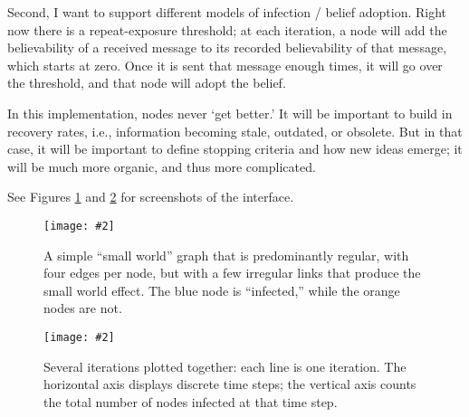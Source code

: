 \documentclass[11pt]{article}
\newcommand\cgraphics[2][]{\centerline{\texttt{[image: \#2]}}}
\begin{document}
Second, I want to support different models of infection / belief adoption. Right now there is a repeat-exposure threshold; at each iteration, a node will add the believability of a received message to its recorded believability of that message, which starts at zero. Once it is sent that message enough times, it will go over the threshold, and that node will adopt the belief.

In this implementation, nodes never `get better.' It will be important to build in recovery rates, i.e., information becoming stale, outdated, or obsolete. But in that case, it will be important to define stopping criteria and how new ideas emerge; it will be much more organic, and thus more complicated.

See Figures \ref{fig:small-world} and \ref{fig:trends} for screenshots of the interface.

\begin{figure}[H]
  \cgraphics[width=.55\columnwidth]{small-world.png}
  \caption{A simple ``small world'' graph that is predominantly regular, with four edges per node, but with a few irregular links that produce the small world effect. The blue node is ``infected,'' while the orange nodes are not.}
  \label{fig:small-world}
\end{figure}
\begin{figure}[H]
  \cgraphics[width=1.1\columnwidth]{trends.png}
  \caption{Several iterations plotted together: each line is one iteration. The horizontal axis displays discrete time steps; the vertical axis counts the total number of nodes infected at that time step.}
  \label{fig:trends}
\end{figure}



\end{document}
